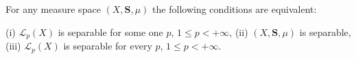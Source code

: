 For any measure space $(X, \mathbf{S}, \mu)$ the following conditions are equivalent:

(i) $\mathcal{L}_p(X)$ is separable for some one $p$, $1 \leq p < +\infty$,
(ii) $(X, \mathbf{S}, \mu)$ is separable,
(iii) $\mathcal{L}_p(X)$ is separable for every $p$, $1 \leq p < +\infty$.
